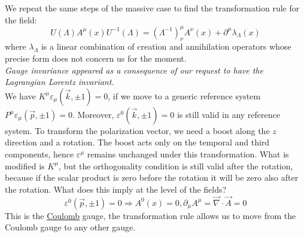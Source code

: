 \documentclass[../main.tex]{subfiles}
\begin{document}
We repeat the same steps of the massive case to find the transformation rule for the field:
\[
U(\Lambda)A^\mu(x)U^{-1}(\Lambda)=(\Lambda^{-1})^\mu_\nu A^\nu(x)+\partial^\mu\lambda_\Lambda(x)
\]
where $\lambda_\Lambda$ is a linear combination of creation and annihilation operators whose precise form does not concern us for the moment.\\ 
\textit{Gauge invariance appeared as a consequence of our request to have the Lagrangian Lorentz invariant.}\\
We have $K^\mu\varepsilon_\mu(\vec{k},\pm1)=0$, if we move to a generic reference system $P^\mu\varepsilon_\mu(\vec{p},\pm1)=0$. Moreover, $\varepsilon^0(\vec{k},\pm1)=0$ is still valid in any reference system. To transform the polarization vector, we need a boost along the $z$ direction and a rotation. The boost acts only on the temporal and third components, hence $\varepsilon^\mu$ remains unchanged under this transformation. What is modified is $K^\mu$, but the orthogonality condition is still valid after the rotation, because if the scalar product is zero before the rotation it will be zero also after the rotation. What does this imply at the level of the fields? 
\[
\varepsilon^0(\vec{p},\pm1)=0\Rightarrow A^0(x)=0, \partial_\mu A^\mu=\vec{\nabla}\cdot\vec{A}=0
\]
This is the \href{https://en.wikipedia.org/wiki/Charles-Augustin_de_Coulomb}{Coulomb} gauge, the transformation rule allows us to move from the Coulomb gauge to any other gauge.
\end{document}
